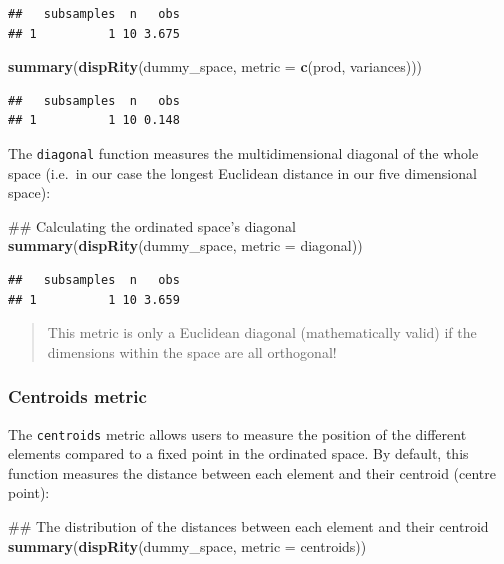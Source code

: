 \documentclass[]{book}
\newenvironment{Shaded}{\begin{snugshade}}{\end{snugshade}}
\newcommand{\KeywordTok}[1]{\textcolor[rgb]{0.13,0.29,0.53}{\textbf{#1}}}
\newcommand{\DataTypeTok}[1]{\textcolor[rgb]{0.13,0.29,0.53}{#1}}
\newcommand{\NormalTok}[1]{#1}
\theoremstyle{definition}
\theoremstyle{definition}
\theoremstyle{remark}
\begin{document}
\begin{verbatim}
##   subsamples  n   obs
## 1          1 10 3.675
\end{verbatim}

\begin{Shaded}
\begin{Highlighting}[]
\KeywordTok{summary}\NormalTok{(}\KeywordTok{dispRity}\NormalTok{(dummy_space, }\DataTypeTok{metric =} \KeywordTok{c}\NormalTok{(prod, variances)))}
\end{Highlighting}
\end{Shaded}

\begin{verbatim}
##   subsamples  n   obs
## 1          1 10 0.148
\end{verbatim}

The \texttt{diagonal} function measures the multidimensional diagonal of
the whole space (i.e.~in our case the longest Euclidean distance in our
five dimensional space):

\begin{Shaded}
\begin{Highlighting}[]
\NormalTok{## Calculating the ordinated space's diagonal}
\KeywordTok{summary}\NormalTok{(}\KeywordTok{dispRity}\NormalTok{(dummy_space, }\DataTypeTok{metric =}\NormalTok{ diagonal))}
\end{Highlighting}
\end{Shaded}

\begin{verbatim}
##   subsamples  n   obs
## 1          1 10 3.659
\end{verbatim}

\begin{quote}
This metric is only a Euclidean diagonal (mathematically valid) if the
dimensions within the space are all orthogonal!
\end{quote}

\subsubsection{Centroids metric}\label{centroids-metric}

The \texttt{centroids} metric allows users to measure the position of
the different elements compared to a fixed point in the ordinated space.
By default, this function measures the distance between each element and
their centroid (centre point):

\begin{Shaded}
\begin{Highlighting}[]
\NormalTok{## The distribution of the distances between each element and their centroid}
\KeywordTok{summary}\NormalTok{(}\KeywordTok{dispRity}\NormalTok{(dummy_space, }\DataTypeTok{metric =}\NormalTok{ centroids))}
\end{Highlighting}
\end{Shaded}
\end{document}
